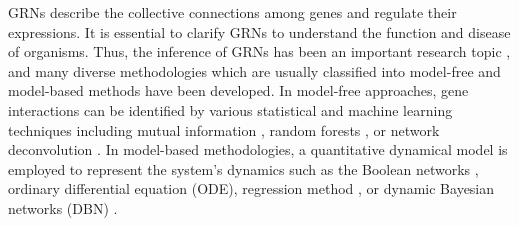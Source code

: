 GRNs describe the collective connections among genes and regulate their expressions. It is essential to clarify GRNs to understand the function and disease of organisms. Thus, the inference of GRNs has been an important research topic \parencite{Malvina2023}, and many diverse methodologies which are usually classified into model-free and model-based methods have been developed. In model-free approaches, gene interactions can be identified by various statistical and machine learning techniques including mutual information \parencite{margolin2006, Yang2018, Liang2008}, random forests \parencite{HuynhThu2010, Petralia2015, Park2018}, or network deconvolution \parencite{Chen2014, SiegalGaskins2009}. In model-based methodologies, a quantitative dynamical model is employed to represent the system's dynamics such as the Boolean networks \parencite{Trinh2021, Hickman2009}, ordinary differential equation (ODE)\parencite{Ma2020, Li2011, Aalto2020, Bin2020}, regression method \parencite{Thorne2018, Michailidis2013, Breiman2001}, or dynamic Bayesian networks (DBN) \parencite{Murphy1999, Kim2003, Zou2005}.\par

